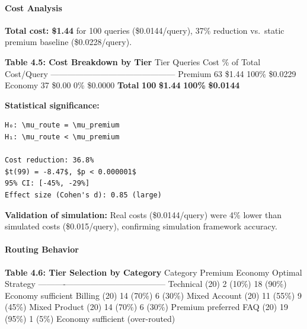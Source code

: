 \documentclass[
]{article}
\begin{document}
\hypertarget{cost-analysis-2}{%
\paragraph{Cost Analysis}\label{cost-analysis-2}}

\textbf{Total cost: \$1.44} for 100 queries (\$0.0144/query), 37\%
reduction vs.~static premium baseline (\$0.0228/query).

\textbf{Table 4.5: Cost Breakdown by Tier} \textbar{} Tier \textbar{}
Queries \textbar{} Cost \textbar{} \% of Total \textbar{} Cost/Query
\textbar{}
\textbar------\textbar---------\textbar------\textbar------------\textbar------------\textbar{}
\textbar{} Premium \textbar{} 63 \textbar{} \$1.44 \textbar{} 100\%
\textbar{} \$0.0229 \textbar{} \textbar{} Economy \textbar{} 37
\textbar{} \$0.00 \textbar{} 0\% \textbar{} \$0.0000 \textbar{}
\textbar{} \textbf{Total} \textbar{} \textbf{100} \textbar{}
\textbf{\$1.44} \textbar{} \textbf{100\%} \textbar{} \textbf{\$0.0144}
\textbar{}

\textbf{Statistical significance:}

\begin{verbatim}
H₀: \mu_route = \mu_premium
H₁: \mu_route < \mu_premium

Cost reduction: 36.8%
$t(99) = -8.47$, $p < 0.000001$
95% CI: [-45%, -29%]
Effect size (Cohen's d): 0.85 (large)
\end{verbatim}

\textbf{Validation of simulation:} Real costs (\$0.0144/query) were 4\%
lower than simulated costs (\$0.015/query), confirming simulation
framework accuracy.

\hypertarget{routing-behavior}{%
\paragraph{Routing Behavior}\label{routing-behavior}}

\textbf{Table 4.6: Tier Selection by Category} \textbar{} Category
\textbar{} Premium \textbar{} Economy \textbar{} Optimal Strategy
\textbar{}
\textbar----------\textbar---------\textbar---------\textbar------------------\textbar{}
\textbar{} Technical (20) \textbar{} 2 (10\%) \textbar{} 18 (90\%)
\textbar{} Economy sufficient \textbar{} \textbar{} Billing (20)
\textbar{} 14 (70\%) \textbar{} 6 (30\%) \textbar{} Mixed \textbar{}
\textbar{} Account (20) \textbar{} 11 (55\%) \textbar{} 9 (45\%)
\textbar{} Mixed \textbar{} \textbar{} Product (20) \textbar{} 14 (70\%)
\textbar{} 6 (30\%) \textbar{} Premium preferred \textbar{} \textbar{}
FAQ (20) \textbar{} 19 (95\%) \textbar{} 1 (5\%) \textbar{} Economy
sufficient (over-routed) \textbar{}
\end{document}
